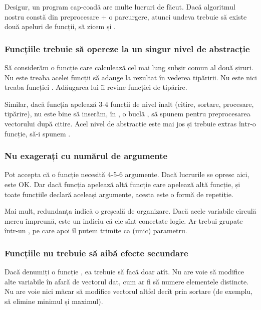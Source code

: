 \documentclass[../main.tex]{subfiles}
\begin{document}
Desigur, un program cap-coadă are multe lucruri de făcut. Dacă algoritmul nostru constă din preprocesare + o parcurgere, atunci undeva trebuie să existe două apeluri de funcții, să zicem  și .

\subsubsection*{Funcțiile trebuie să opereze la un singur nivel de abstracție}

Să considerăm o funcție care calculează cel mai lung subșir comun al două șiruri. Nu este treaba acelei funcții să adauge  la rezultat în vederea tipăririi. Nu este nici treaba funcției . Adăugarea lui  îi revine funcției de tipărire.

Similar, dacă funcția  apelează 3-4 funcții de nivel înalt (citire, sortare, procesare, tipărire), nu este bine să inserăm, în , o buclă , să spunem pentru preprocesarea vectorului după citire. Acel nivel de abstracție este mai jos și trebuie extras într-o funcție, să-i spunem .

\subsubsection*{Nu exagerați cu numărul de argumente}

Pot accepta că o funcție necesită 4-5-6 argumente. Dacă lucrurile se opresc aici, este OK. Dar dacă funcția apelează altă funcție care apelează altă funcție, și toate funcțiile declară aceleași argumente, acesta este o formă de repetiție.

Mai mult, redundanța indică o greșeală de organizare. Dacă acele variabile circulă mereu împreună, este un indiciu că ele sînt conectate logic. Ar trebui grupate într-un , pe care apoi îl putem trimite ca (unic) parametru.

\subsubsection*{Funcțiile nu trebuie să aibă efecte secundare}

Dacă denumiți o funcție , ea trebuie să facă doar atît. Nu are voie să modifice alte variabile în afară de vectorul dat, cum ar fi să numere elementele distincte. Nu are voie nici măcar să modifice vectorul altfel decît prin sortare (de exemplu, să elimine minimul și maximul).
\end{document}
